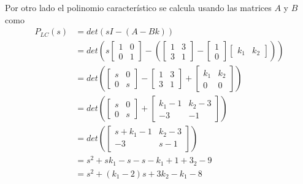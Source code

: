 Por otro lado el polinomio característico se calcula usando las matrices \( A \) y \( B \) como 
\[
    \begin{split}
        P_{LC}(s) & = det(sI-(A-Bk)) \\
        & = det
            (s
                \begin{bmatrix} 1 & 0 \\ 0 & 1   \end{bmatrix}
                -(
                \begin{bmatrix} 1 & 3 \\ 3 & 1  \end{bmatrix} 
                - 
                \begin{bmatrix} 1 \\ 0  \end{bmatrix}
                \begin{bmatrix} k_{1} & k_{2}   \end{bmatrix})
            ) \\
        & = det
            (
                \begin{bmatrix} s & 0 \\ 0 & s   \end{bmatrix}
                -
                \begin{bmatrix} 1 & 3 \\ 3 & 1  \end{bmatrix}
                +
                \begin{bmatrix} k_{1} & k_{2} \\ 0 & 0  \end{bmatrix}
            ) \\
        & = det
            (
                \begin{bmatrix} s & 0 \\ 0 & s   \end{bmatrix}
                +
                \begin{bmatrix} k_{1}-1 & k_{2}-3 \\ -3 & -1  \end{bmatrix}
            ) \\
        & = det
            (
            \begin{bmatrix}
                        s+k_{1}-1 & k_{2}-3 \\
                        -3 & s-1 \\
            \end{bmatrix}
            ) \\
        & = s^{2} + sk_{1} - s - s - k_{1} + 1 + 3_{2} - 9 \\
        & = s^{2} + (k_{1} - 2)s + 3k_{2} - k_{1} - 8
    \end{split}
\]

